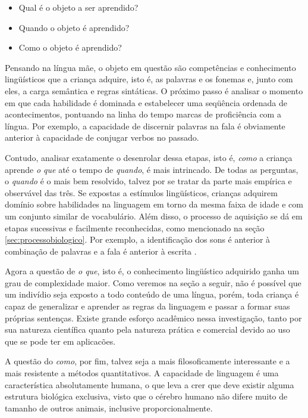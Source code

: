 \begin{itemize}
\item Qual é o objeto a ser aprendido?
\item Quando o objeto é aprendido?
\item Como o objeto é aprendido?
\end{itemize}

Pensando na língua mãe, o objeto em questão são competências e conhecimento lingüísticos que a criança adquire, isto é, as palavras e os fonemas e, junto com eles, a carga semântica e regras sintáticas. O próximo passo é analisar o momento em que cada habilidade é dominada e estabelecer uma seqüência ordenada de acontecimentos, pontuando na linha do tempo marcas de proficiência com a língua. Por exemplo, a capacidade de discernir palavras na fala é obviamente anterior à capacidade de conjugar verbos no passado.

Contudo, analisar exatamente o desenrolar dessa etapas, isto é, \emph{como} a criança aprende \emph{o que} até o tempo de \emph{quando}, é mais intrincado. De todas as perguntas, o \emph{quando} é o mais bem resolvido, talvez por se tratar da parte mais empírica e observável das três. Se expostas a estímulos lingüísticos, crianças adquirem domínio sobre habilidades na linguagem em torno da mesma faixa de idade e com um conjunto similar de vocabulário. Além disso, o processo de aquisição se dá em etapas sucessivas e facilmente reconhecidas, como mencionado na seção \ref{sec:processobiologico}. Por exemplo, a identificação dos sons é anterior à combinação de palavras e a fala é anterior à escrita \citep{bertolo2001language}.

Agora a questão de \emph{o que}, isto é, o conhecimento lingüístico adquirido ganha um grau de complexidade maior. Como veremos na seção a seguir, não é possível que um indivídio seja exposto a todo conteúdo de uma língua, porém, toda criança é capaz de generalizar e aprender as regras da linguagem e passar a formar suas próprias sentenças. Existe grande esforço acadêmico nessa investigação, tanto por sua natureza científica quanto pela natureza prática e comercial devido ao uso que se pode ter em aplicacões.

A questão do \emph{como}, por fim, talvez seja a mais filosoficamente interessante e a mais resistente a métodos quantitativos. A capacidade de linguagem é uma característica absolutamente humana, o que leva a crer que deve existir alguma estrutura biológica exclusiva, visto que o cérebro humano não difere muito de tamanho de outros animais, inclusive proporcionalmente.

